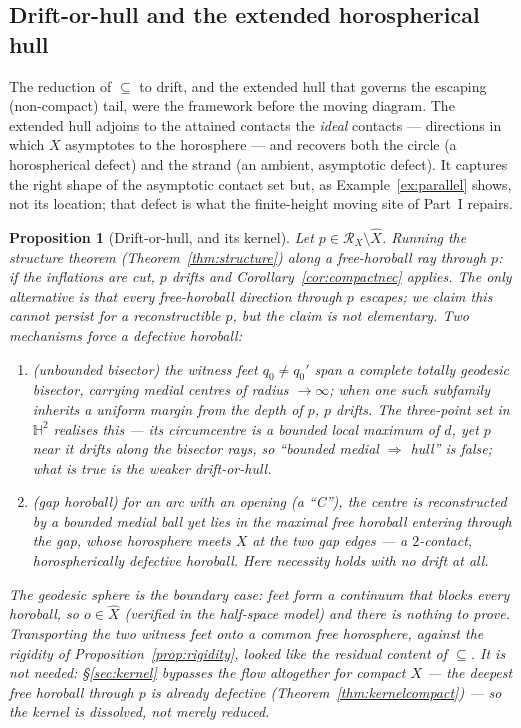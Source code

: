 \documentclass[11pt]{article}
\newtheorem{proposition}[theorem]{Proposition}
\theoremstyle{remark}
\newcommand{\X}{X}
\newcommand{\Xhat}{\widehat{\X}}
\newcommand{\Rx}{\mathcal{R}_{\X}}
\begin{document}
\subsection{Drift-or-hull and the extended
horospherical hull}\label{sec:residue}
The reduction of $\subseteq$ to drift, and the extended hull that governs
the escaping (non-compact) tail, were the framework before the moving
diagram. The extended hull adjoins to the attained contacts the
\emph{ideal} contacts --- directions in which $\X$ asymptotes to the
horosphere --- and recovers both the circle (a horospherical defect) and
the strand (an ambient, asymptotic defect). It captures the right shape
of the asymptotic contact set but, as Example~\ref{ex:parallel} shows,
not its location; that defect is what the finite-height moving site of
Part~I repairs.

\begin{proposition}[Drift-or-hull, and its kernel]
\label{rem:spherecentre}
Let $p\in\Rx\setminus\Xhat$. Running the structure theorem
(Theorem~\ref{thm:structure}) along a free-horoball ray through $p$:
if the inflations are cut, $p$ drifts and
Corollary~\ref{cor:compactnec} applies. The only alternative is that
\emph{every} free-horoball direction through $p$ escapes; we claim
this cannot persist for a reconstructible $p$, but the claim is not
elementary. Two mechanisms force a defective horoball:
\begin{enumerate}[label=(\alph*)]
\item \emph{(unbounded bisector)} the witness feet $q_{0}\neq q_{0}'$
span a complete totally geodesic bisector, carrying medial centres of
radius $\to\infty$; when one such subfamily inherits a uniform margin
from the depth of $p$, $p$ drifts. The three-point set in
$\mathbb{H}^{2}$ realises this --- its circumcentre is a \emph{bounded}
local maximum of $d$, yet $p$ near it drifts along the bisector rays,
so ``bounded medial $\Rightarrow$ hull'' is false; what is true is the
weaker drift-or-hull.
\item \emph{(gap horoball)} for an arc with an opening (a ``C''), the
centre is reconstructed by a \emph{bounded} medial ball yet lies in
the maximal free horoball entering through the gap, whose horosphere
meets $\X$ at the two gap edges --- a $2$-contact, horospherically
defective horoball. Here necessity holds with no drift at all.
\end{enumerate}
The geodesic sphere is the boundary case: feet form a continuum that
blocks every horoball, so $o\in\Xhat$ (verified in the half-space
model) and there is nothing to prove. Transporting the two witness
feet onto a common free horosphere, against the rigidity of
Proposition~\ref{prop:rigidity}, looked like the residual content of
$\subseteq$. \emph{It is not needed:} \S\ref{sec:kernel} bypasses the
flow altogether for compact $\X$ --- the deepest free horoball through
$p$ is already defective (Theorem~\ref{thm:kernelcompact}) --- so the
kernel is dissolved, not merely reduced.
\end{proposition}
\end{document}
